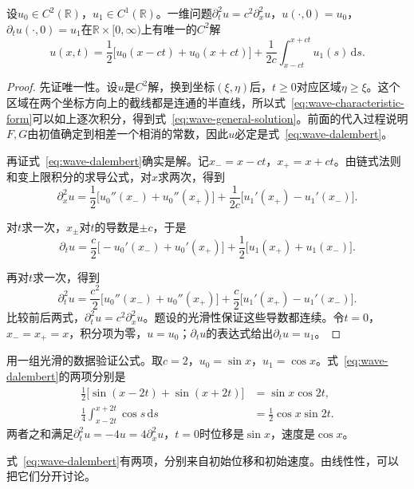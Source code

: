 \begin{theorem}
\label{thm:wave-dalembert}
设$u_0\in C^{2}(\mathbb{R})$，$u_1\in C^{1}(\mathbb{R})$。一维问题$\partial_t^{2}u=c^{2}\partial_x^{2}u$，$u(\cdot,0)=u_0$，$\partial_tu(\cdot,0)=u_1$在$\mathbb{R}\times[0,\infty)$上有唯一的$C^{2}$解
\begin{equation}
 u(x,t)=\frac12\bigl[u_0(x-ct)+u_0(x+ct)\bigr]+\frac1{2c}\int_{x-ct}^{x+ct}u_1(s)\,\mathrm{d}s .
 \label{eq:wave-dalembert}
\end{equation}
\end{theorem}

\begin{proof}
先证唯一性。设$u$是$C^{2}$解，换到坐标$(\xi,\eta)$后，$t\geq0$对应区域$\eta\geq\xi$。这个区域在两个坐标方向上的截线都是连通的半直线，所以式~\eqref{eq:wave-characteristic-form}可以如上逐次积分，得到式~\eqref{eq:wave-general-solution}。前面的代入过程说明$F,G$由初值确定到相差一个相消的常数，因此$u$必定是式~\eqref{eq:wave-dalembert}。

再证式~\eqref{eq:wave-dalembert}确实是解。记$x_-=x-ct$，$x_+=x+ct$。由链式法则和变上限积分的求导公式，对$x$求两次，得到
\[
 \partial_x^{2}u=\frac12\bigl[u_0''(x_-)+u_0''(x_+)\bigr]+\frac1{2c}\bigl[u_1'(x_+)-u_1'(x_-)\bigr].
\]

对$t$求一次，$x_\pm$对$t$的导数是$\pm c$，于是
\[
 \partial_tu=\frac c2\bigl[-u_0'(x_-)+u_0'(x_+)\bigr]+\frac12\bigl[u_1(x_+)+u_1(x_-)\bigr].
\]

再对$t$求一次，得到
\[
 \partial_t^{2}u=\frac{c^{2}}2\bigl[u_0''(x_-)+u_0''(x_+)\bigr]+\frac c2\bigl[u_1'(x_+)-u_1'(x_-)\bigr].
\]
比较前后两式，$\partial_t^{2}u=c^{2}\partial_x^{2}u$。题设的光滑性保证这些导数都连续。令$t=0$，$x_-=x_+=x$，积分项为零，$u=u_0$；$\partial_tu$的表达式给出$\partial_tu=u_1$。
\end{proof}

用一组光滑的数据验证公式。取$c=2$，$u_0=\sin x$，$u_1=\cos x$。式~\eqref{eq:wave-dalembert}的两项分别是
\[
 \begin{aligned}
  \frac12\bigl[\sin(x-2t)+\sin(x+2t)\bigr]&=\sin x\cos2t,\\
  \frac14\int_{x-2t}^{x+2t}\cos s\,\mathrm{d}s&=\frac12\cos x\sin2t .
 \end{aligned}
\]
两者之和满足$\partial_t^{2}u=-4u=4\partial_x^{2}u$，$t=0$时位移是$\sin x$，速度是$\cos x$。

式~\eqref{eq:wave-dalembert}有两项，分别来自初始位移和初始速度。由线性性，可以把它们分开讨论。

